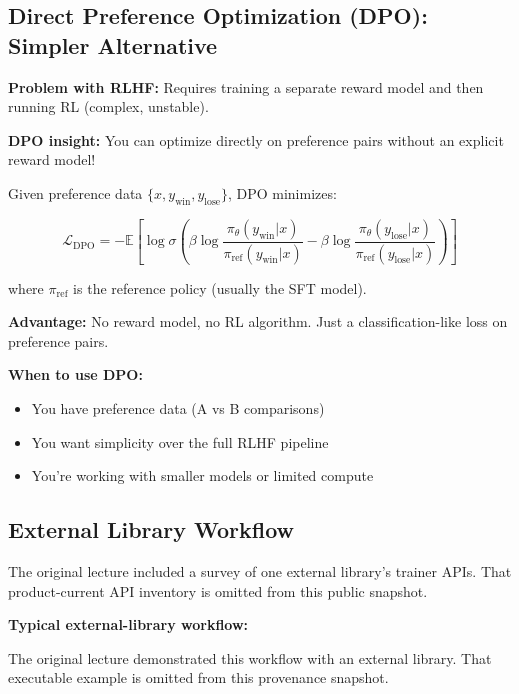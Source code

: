 \documentclass{article}
\begin{document}
\subsection{Direct Preference Optimization (DPO): Simpler Alternative}

\textbf{Problem with RLHF:} Requires training a separate reward model and then running RL (complex, unstable).

\textbf{DPO insight:} You can optimize directly on preference pairs without an explicit reward model!

Given preference data $\{x, y_{\text{win}}, y_{\text{lose}}\}$, DPO minimizes:

\begin{equation}
\mathcal{L}_{\text{DPO}} = -\mathbb{E} \left[ \log \sigma\left( \beta \log \frac{\pi_\theta(y_{\text{win}}|x)}{\pi_{\text{ref}}(y_{\text{win}}|x)} - \beta \log \frac{\pi_\theta(y_{\text{lose}}|x)}{\pi_{\text{ref}}(y_{\text{lose}}|x)} \right) \right]
\end{equation}

where $\pi_{\text{ref}}$ is the reference policy (usually the SFT model).

\textbf{Advantage:} No reward model, no RL algorithm. Just a classification-like loss on preference pairs.

\textbf{When to use DPO:}
\begin{itemize}
\item You have preference data (A vs B comparisons)
\item You want simplicity over the full RLHF pipeline
\item You're working with smaller models or limited compute
\end{itemize}

\subsection{External Library Workflow}

The original lecture included a survey of one external library's trainer APIs.
That product-current API inventory is omitted from this public snapshot.

\textbf{Typical external-library workflow:}


The original lecture demonstrated this workflow with an external library. That executable example is omitted from this provenance snapshot.
\end{document}
